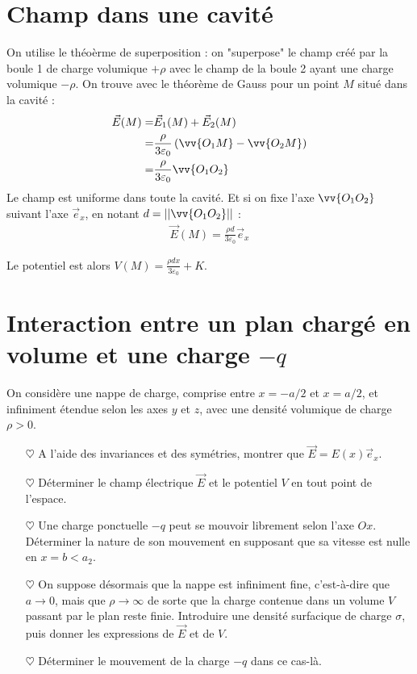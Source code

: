 \documentclass{report}
\begin{document}
\section*{Champ dans une cavité}

On utilise le théoèrme de superposition : on "superpose" le champ créé par la boule 1 de charge volumique $+\rho$ avec le champ de la boule 2 ayant une charge volumique $-\rho$.
On trouve avec le théorème de Gauss pour un point $M$ situé dans la cavité :
\begin{align*}
	\vec{E}(M)=&\vec{E}_1(M)+\vec{E}_2(M)\\
	=&\frac{\rho}{3\varepsilon_0}\left(\vv{O_1M}-\vv{O_2M} \right) \\
	=&\frac{\rho}{3\varepsilon_0}\vv{O_1O_2}
\end{align*}
Le champ est uniforme dans toute la cavité. Et si on fixe l'axe $\vv{O_1O_2}$ suivant l'axe $\vec{e}_x$, en notant $d=||\vv{O_1O_2}||$ :
\begin{align*}
	\vec{E}(M)=\frac{\rho d}{3\varepsilon_0}\vec{e}_x
\end{align*}

Le potentiel est alors $V(M)=\frac{\rho d x}{3\varepsilon_0}+ K$.

\section*{Interaction entre un plan chargé en volume et une charge $-q$}

On considère une nappe de charge, comprise entre $x=-a/2$ et $x=a/2$, et infiniment étendue selon les axes $y$ et $z$, avec une densité volumique de charge $\rho>0$.

\begin{itemize}

	\item[$\heartsuit$] A l'aide des invariances et des symétries, montrer que $\vec{E}=E(x)\vec{e}_x$.

	\item[$\heartsuit$] Déterminer le champ électrique $\vec{E}$ et le potentiel $V$ en tout point de l'espace.
	
	\item[$\heartsuit$] Une charge ponctuelle $-q$ peut se mouvoir librement selon l'axe $Ox$. Déterminer la nature de son mouvement en supposant que sa vitesse est nulle en $x=b<a_2$.
	
	\item[$\heartsuit$] On suppose désormais que la nappe est infiniment fine, c'est-à-dire que $a\longrightarrow0$, mais que $\rho\longrightarrow\infty$ de sorte que la charge contenue dans un volume $V$ passant par le plan reste finie. Introduire une densité surfacique de charge $\sigma$, puis donner les expressions de $\vec{E}$ et de $V$.
	
	\item[$\heartsuit$] Déterminer le mouvement de la charge $-q$ dans ce cas-là. 

\end{itemize}
\end{document}
